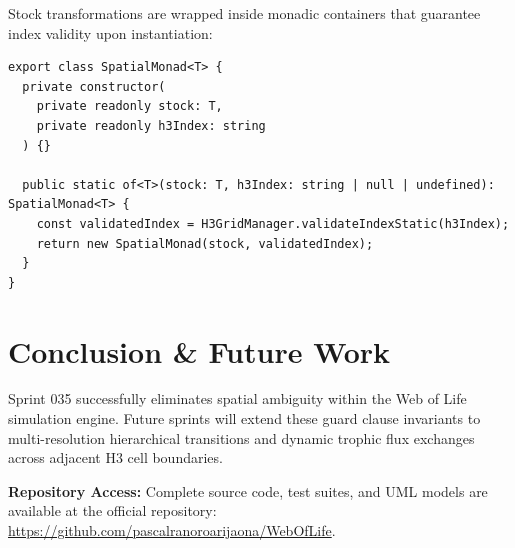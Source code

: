 \documentclass[11pt, a4paper]{article}
\begin{document}
Stock transformations are wrapped inside monadic containers that guarantee index validity upon instantiation:

\begin{lstlisting}
export class SpatialMonad<T> {
  private constructor(
    private readonly stock: T,
    private readonly h3Index: string
  ) {}

  public static of<T>(stock: T, h3Index: string | null | undefined): SpatialMonad<T> {
    const validatedIndex = H3GridManager.validateIndexStatic(h3Index);
    return new SpatialMonad(stock, validatedIndex);
  }
}
\end{lstlisting}

\section{Conclusion \& Future Work}
Sprint 035 successfully eliminates spatial ambiguity within the Web of Life simulation engine. Future sprints will extend these guard clause invariants to multi-resolution hierarchical transitions and dynamic trophic flux exchanges across adjacent H3 cell boundaries.

\vspace{1em}
\noindent \textbf{Repository Access:} Complete source code, test suites, and UML models are available at the official repository: \url{https://github.com/pascalranoroarijaona/WebOfLife}.
\end{document}
